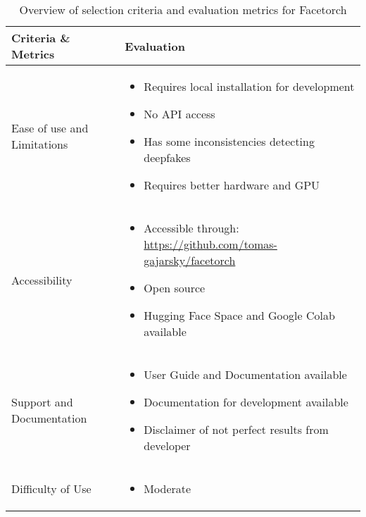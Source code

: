 \begin{table}[htpb]
	\caption{Overview of selection criteria and evaluation metrics for Facetorch}\label{tab:facetorch-overview}
	\centering
	\small
	\begin{tabularx}{\textwidth}{l X}
		\toprule
		\textbf{Criteria \& Metrics} & \textbf{Evaluation}                                                        \\
		\midrule
		Ease of use and Limitations  & \begin{itemize}[nosep,nolistsep,noitemsep]
			                               \item Requires local installation for development
			                               \item No \ac{API} access
			                               \item Has some inconsistencies detecting deepfakes
			                               \item Requires better hardware and \ac{GPU}
		                               \end{itemize}                          \\
		Accessibility                & \begin{itemize}[nosep,nolistsep,noitemsep]
			                               \item Accessible through: \url{https://github.com/tomas-gajarsky/facetorch}
			                               \item Open source
			                               \item Hugging Face Space and Google Colab available
		                               \end{itemize} \\
		Support and Documentation    & \begin{itemize}[nosep,nolistsep,noitemsep]
			                               \item User Guide and Documentation available
			                               \item Documentation for development available
			                               \item Disclaimer of not perfect results from developer
		                               \end{itemize}                      \\
		Difficulty of Use            & \begin{itemize}[nosep,nolistsep,noitemsep]
			                               \item Moderate

\end{itemize}
\end{tabularx}
\end{table}
